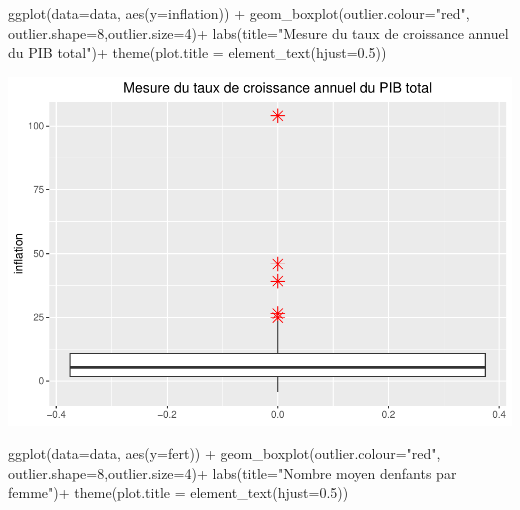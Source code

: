 \documentclass[
]{article}
\newenvironment{Shaded}{\begin{snugshade}}{\end{snugshade}}
\newcommand{\AttributeTok}[1]{\textcolor[rgb]{0.77,0.63,0.00}{#1}}
\newcommand{\DecValTok}[1]{\textcolor[rgb]{0.00,0.00,0.81}{#1}}
\newcommand{\FloatTok}[1]{\textcolor[rgb]{0.00,0.00,0.81}{#1}}
\newcommand{\FunctionTok}[1]{\textcolor[rgb]{0.00,0.00,0.00}{#1}}
\newcommand{\NormalTok}[1]{#1}
\newcommand{\SpecialCharTok}[1]{\textcolor[rgb]{0.00,0.00,0.00}{#1}}
\newcommand{\StringTok}[1]{\textcolor[rgb]{0.31,0.60,0.02}{#1}}
\begin{document}
\begin{Shaded}
\begin{Highlighting}[]
\FunctionTok{ggplot}\NormalTok{(}\AttributeTok{data=}\NormalTok{data, }\FunctionTok{aes}\NormalTok{(}\AttributeTok{y=}\NormalTok{inflation)) }\SpecialCharTok{+} 
  \FunctionTok{geom\_boxplot}\NormalTok{(}\AttributeTok{outlier.colour=}\StringTok{"red"}\NormalTok{, }\AttributeTok{outlier.shape=}\DecValTok{8}\NormalTok{,}\AttributeTok{outlier.size=}\DecValTok{4}\NormalTok{)}\SpecialCharTok{+}
  \FunctionTok{labs}\NormalTok{(}\AttributeTok{title=}\StringTok{"Mesure du taux de croissance annuel du PIB total"}\NormalTok{)}\SpecialCharTok{+}
  \FunctionTok{theme}\NormalTok{(}\AttributeTok{plot.title =} \FunctionTok{element\_text}\NormalTok{(}\AttributeTok{hjust=}\FloatTok{0.5}\NormalTok{))}
\end{Highlighting}
\end{Shaded}

\includegraphics{projet_apprentissage_non_supp_files/figure-latex/unnamed-chunk-8-1.pdf}

\begin{Shaded}
\begin{Highlighting}[]
\FunctionTok{ggplot}\NormalTok{(}\AttributeTok{data=}\NormalTok{data, }\FunctionTok{aes}\NormalTok{(}\AttributeTok{y=}\NormalTok{fert)) }\SpecialCharTok{+} 
  \FunctionTok{geom\_boxplot}\NormalTok{(}\AttributeTok{outlier.colour=}\StringTok{"red"}\NormalTok{, }\AttributeTok{outlier.shape=}\DecValTok{8}\NormalTok{,}\AttributeTok{outlier.size=}\DecValTok{4}\NormalTok{)}\SpecialCharTok{+}
  \FunctionTok{labs}\NormalTok{(}\AttributeTok{title=}\StringTok{"Nombre moyen d\textquotesingle{}enfants par femme"}\NormalTok{)}\SpecialCharTok{+}
  \FunctionTok{theme}\NormalTok{(}\AttributeTok{plot.title =} \FunctionTok{element\_text}\NormalTok{(}\AttributeTok{hjust=}\FloatTok{0.5}\NormalTok{))}
\end{Highlighting}
\end{Shaded}
\end{document}
